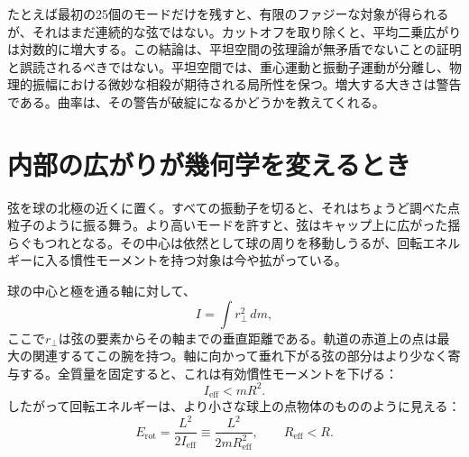 たとえば最初の25個のモードだけを残すと、有限のファジーな対象が得られるが、それはまだ連続的な弦ではない。カットオフを取り除くと、平均二乗広がりは対数的に増大する。この結論は、平坦空間の弦理論が無矛盾でないことの証明と誤読されるべきではない。平坦空間では、重心運動と振動子運動が分離し、物理的振幅における微妙な相殺が期待される局所性を保つ。増大する大きさは警告である。曲率は、その警告が破綻になるかどうかを教えてくれる。

\section{内部の広がりが幾何学を変えるとき}

弦を球の北極の近くに置く。すべての振動子を切ると、それはちょうど調べた点粒子のように振る舞う。より高いモードを許すと、弦はキャップ上に広がった揺らぐもつれとなる。その中心は依然として球の周りを移動しうるが、回転エネルギーに入る慣性モーメントを持つ対象は今や拡がっている。

球の中心と極を通る軸に対して、
\begin{equation}
  I=\int r_\perp^2\,dm,
  \label{eq:l09-extended-inertia}
\end{equation}
ここで\(r_\perp\)は弦の要素からその軸までの垂直距離である。軌道の赤道上の点は最大の関連するてこの腕を持つ。軸に向かって垂れ下がる弦の部分はより少なく寄与する。全質量を固定すると、これは有効慣性モーメントを下げる：
\begin{equation}
  I_{\mathrm{eff}}<mR^2.
  \label{eq:l09-inertia-reduction}
\end{equation}
したがって回転エネルギーは、より小さな球上の点物体のもののように見える：
\begin{equation}
  E_{\mathrm{rot}}
  =\frac{L^2}{2I_{\mathrm{eff}}}
  \equiv \frac{L^2}{2mR_{\mathrm{eff}}^2},
  \qquad R_{\mathrm{eff}}<R.
  \label{eq:l09-effective-radius}
\end{equation}

\begin{classroomqa}
\end{classroomqa}

